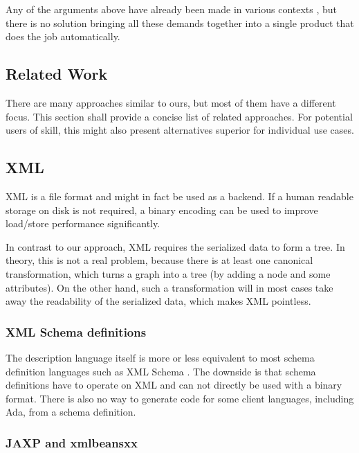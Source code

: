 Any of the arguments above have already been made in various contexts , but there is no solution bringing all these demands together into a single product that does the job automatically.


\subsection{Related Work}

There are many approaches similar to ours, but most of them have a different focus. This section shall provide a concise list of related approaches. For potential users of skill, this might also present alternatives superior for individual use cases.

\subsection*{XML}

XML is a file format and might in fact be used as a backend. If a human readable storage on disk is not required, a binary encoding can be used to improve load/store performance significantly.

In contrast to our approach, XML requires the serialized data to form a tree. In theory, this is not a real problem, because there is at least one canonical transformation, which turns a graph into a tree (by adding a node and some attributes). On the other hand, such a transformation will in most cases take away the readability of the serialized data, which makes XML pointless.

\subsubsection*{XML Schema definitions}

The description language itself is more or less equivalent to most schema definition languages such as XML Schema . The downside is that schema definitions have to operate on XML and can not directly be used with a binary format. There is also
no way to generate code for some client languages, including Ada, from a schema definition.

\subsubsection*{JAXP and xmlbeansxx}

